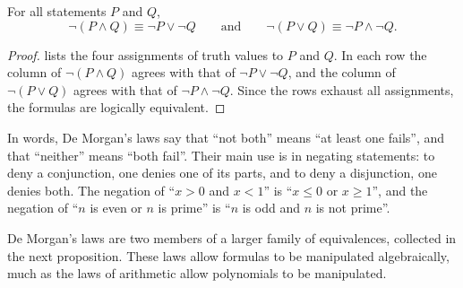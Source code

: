 \begin{theorem}
\label{thm:de-morgan}
For all statements $P$ and $Q$,
\[
\neg(P\wedge Q)\equiv\neg P\vee\neg Q
\qquad\text{and}\qquad
\neg(P\vee Q)\equiv\neg P\wedge\neg Q .
\]
\end{theorem}

\begin{proof}
 lists the four assignments of truth values to $P$ and $Q$. In each row the column of $\neg(P\wedge Q)$ agrees with that of $\neg P\vee\neg Q$, and the column of $\neg(P\vee Q)$ agrees with that of $\neg P\wedge\neg Q$. Since the rows exhaust all assignments, the formulas are logically equivalent.
\end{proof}

\begin{table}
\end{table}

In words, De Morgan's laws say that ``not both'' means ``at least one fails'', and that ``neither'' means ``both fail''. Their main use is in negating statements: to deny a conjunction, one denies one of its parts, and to deny a disjunction, one denies both. The negation of ``$x>0$ and $x<1$'' is ``$x\le 0$ or $x\ge 1$'', and the negation of ``$n$ is even or $n$ is prime'' is ``$n$ is odd and $n$ is not prime''.

De Morgan's laws are two members of a larger family of equivalences, collected in the next proposition. These laws allow formulas to be manipulated algebraically, much as the laws of arithmetic allow polynomials to be manipulated.

